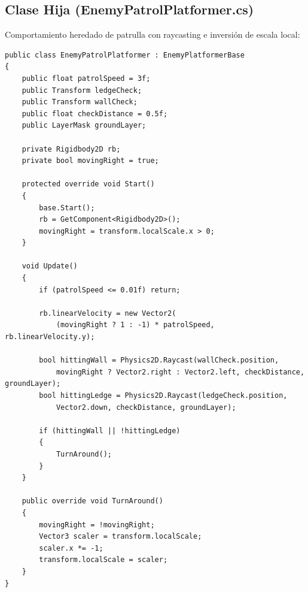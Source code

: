 \clearpage
\subsection{Clase Hija (EnemyPatrolPlatformer.cs)}
Comportamiento heredado de patrulla con raycasting e inversión de escala local:

\begin{verbatim}
public class EnemyPatrolPlatformer : EnemyPlatformerBase
{
    public float patrolSpeed = 3f;
    public Transform ledgeCheck; 
    public Transform wallCheck;  
    public float checkDistance = 0.5f;
    public LayerMask groundLayer;

    private Rigidbody2D rb;
    private bool movingRight = true;

    protected override void Start()
    {
        base.Start(); 
        rb = GetComponent<Rigidbody2D>();
        movingRight = transform.localScale.x > 0;
    }

    void Update()
    {
        if (patrolSpeed <= 0.01f) return;

        rb.linearVelocity = new Vector2(
            (movingRight ? 1 : -1) * patrolSpeed, rb.linearVelocity.y);

        bool hittingWall = Physics2D.Raycast(wallCheck.position, 
            movingRight ? Vector2.right : Vector2.left, checkDistance, groundLayer);
        bool hittingLedge = Physics2D.Raycast(ledgeCheck.position, 
            Vector2.down, checkDistance, groundLayer);

        if (hittingWall || !hittingLedge)
        {
            TurnAround();
        }
    }

    public override void TurnAround()
    {
        movingRight = !movingRight;
        Vector3 scaler = transform.localScale;
        scaler.x *= -1;
        transform.localScale = scaler;
    }
}
\end{verbatim}